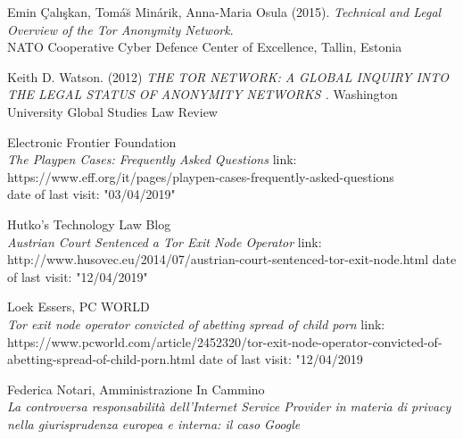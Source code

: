 \documentclass[runningheads,a4paper]{llncs}
\begin{document}
\newpage


\begin{thebibliography}{9}

Emin \c{C}alı\c{s}kan, Tom\'{a}\u{s} Min\'{a}rik, Anna-Maria Osula (2015).
\textit{Technical and Legal Overview of the 
Tor Anonymity Network}.\\
NATO Cooperative Cyber Defence Center of 
Excellence, Tallin, Estonia

    Keith D. Watson. (2012)
    \textit{ THE TOR NETWORK: A GLOBAL INQUIRY INTO THE LEGAL STATUS OF ANONYMITY NETWORKS . }
    Washington University Global Studies Law Review

    Electronic Frontier Foundation\\
    \textit{The Playpen Cases: Frequently Asked Questions}
    link: https://www.eff.org/it/pages/playpen-cases-frequently-asked-questions\\
    date of last visit: "03/04/2019"
    
    Hutko's Technology Law Blog\\
    \textit{Austrian Court Sentenced a Tor Exit Node Operator}
    link:     http://www.husovec.eu/2014/07/austrian-court-sentenced-tor-exit-node.html
    date of last visit: "12/04/2019"
    
    Loek Essers, PC WORLD\\
    \textit{Tor exit node operator convicted of abetting spread of child porn}
    link:         https://www.pcworld.com/article/2452320/tor-exit-node-operator-convicted-of-abetting-spread-of-child-porn.html
    date of last visit: "12/04/2019
    
    Federica Notari, Amministrazione In Cammino\\
    \textit{    La controversa responsabilità dell’Internet Service Provider in materia di privacy nella giurisprudenza europea e interna: il caso Google}



\end{thebibliography}
\end{document}
